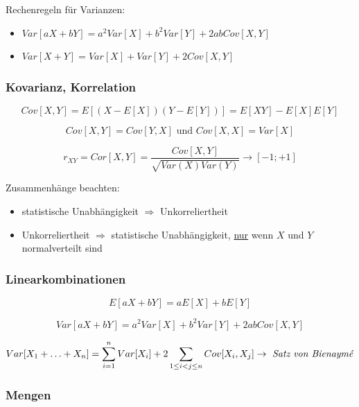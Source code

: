Rechenregeln für Varianzen:
\begin{itemize}
    \item \(Var[aX+bY]=a^2Var[X]+b^2Var[Y]+2abCov[X,Y]\)
    \item \(Var[X+Y]=Var[X]+Var[Y]+2Cov[X,Y]\)
\end{itemize}



\subsubsection{Kovarianz, Korrelation}
\begin{equation*}
    Cov[X,Y]=E[(X-E[X])(Y-E[Y])]=E[XY]-E[X]E[Y]
\end{equation*}

\begin{equation*}
    Cov[X,Y]=Cov[Y,X] \text{ und } Cov[X,X]=Var[X]
\end{equation*}

\begin{equation*}
    r_{XY} = Cor[X,Y]=\frac{Cov[X,Y]}{\sqrt{Var(X)Var(Y)}} \rightarrow [-1;+1]
\end{equation*}

Zusammenhänge beachten: 
\begin{itemize}
    \item statistische Unabhängigkeit \(\Rightarrow\) Unkorreliertheit
    \item Unkorreliertheit \(\Rightarrow\) statistische Unabhängigkeit, \underline{nur} wenn \(X\) und \(Y\) normalverteilt sind
\end{itemize}

\subsubsection{Linearkombinationen}
\begin{equation*}
    E[aX+bY]=aE[X]+bE[Y]
\end{equation*}

\begin{equation*}
    Var[aX+bY]=a^2Var[X]+b^2Var[Y]+2abCov[X,Y]
\end{equation*}

\begin{equation*}
    Var[X_1 + \hdots + X_n]=\sum_{i=1}^{n}Var[X_i] + 2\sum_{1\leq i<j\leq n}Cov[X_i,X_j] \rightarrow\text{ \emph{Satz von Bienaymé}}
\end{equation*}

\subsubsection{Mengen}


